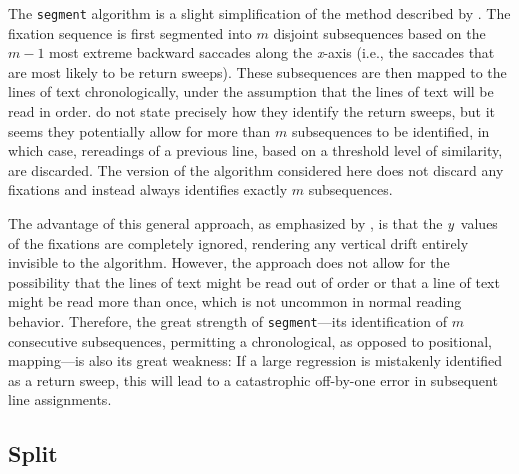 \documentclass[doc,biblatex]{apa7}
\begin{document}
The \texttt{segment} algorithm is a slight simplification of the method described by \textcite{Abdulin:2015}. The fixation sequence is first segmented into $m$ disjoint subsequences based on the $m-1$ most extreme backward saccades along the \textit{x}-axis (i.e., the saccades that are most likely to be return sweeps). These subsequences are then mapped to the lines of text chronologically, under the assumption that the lines of text will be read in order. \textcite{Abdulin:2015} do not state precisely how they identify the return sweeps, but it seems they potentially allow for more than $m$ subsequences to be identified, in which case, rereadings of a previous line, based on a threshold level of similarity, are discarded. The version of the algorithm considered here does not discard any fixations and instead always identifies exactly $m$ subsequences.

The advantage of this general approach, as emphasized by \textcite{Abdulin:2015}, is that the \textit{y}~values of the fixations are completely ignored, rendering any vertical drift entirely invisible to the algorithm. However, the approach does not allow for the possibility that the lines of text might be read out of order or that a line of text might be read more than once, which is not uncommon in normal reading behavior. Therefore, the great strength of \texttt{segment}---its identification of $m$ consecutive subsequences, permitting a chronological, as opposed to positional, mapping---is also its great weakness: If a large regression is mistakenly identified as a return sweep, this will lead to a catastrophic off-by-one error in subsequent line assignments.

\subsection{Split}
\end{document}
